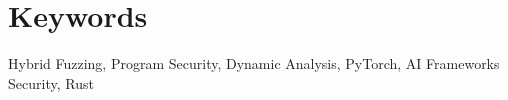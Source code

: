 \documentclass[a4paper,14pt]{extarticle}
\begin{document}
\section*{Keywords}
Hybrid Fuzzing, Program Security, Dynamic Analysis, PyTorch, AI Frameworks Security, Rust
\pagebreak













\newpage

\printbibliography[heading=bibintoc]   %


\end{document}
